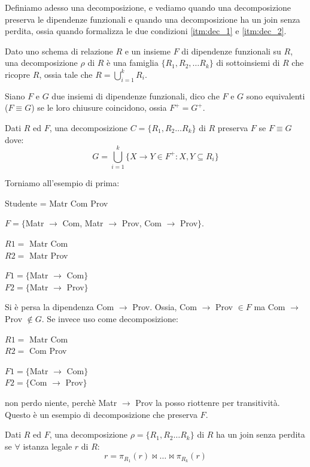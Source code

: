Definiamo adesso una decomposizione, e vediamo quando una decomposizione preserva le dipendenze funzionali e quando una decomposizione ha un join senza perdita, ossia quando formalizza le due condizioni \ref{itm:dec_1} e \ref{itm:dec_2}.

\begin{defn}
Dato uno schema di relazione $R$ e un insieme $F$ di dipendenze funzionali su $R$, una decomposizione $\rho$ di $R$ \`e una famiglia $\{R_1, R_2, \dots R_k\}$ di sottoinsiemi di $R$ che ricopre $R$, ossia tale che $R = \bigcup_{i = 1}^{k} R_i$.
\end{defn}

\begin{defn}
Siano $F$ e $G$ due insiemi di dipendenze funzionali, dico che $F$ e $G$ sono equivalenti ($F \equiv G$) se le loro chiusure coincidono, ossia $F^+ = G^+$.
\end{defn}

\begin{defn}
\label{definizione_insieme_G}
Dati $R$ ed $F$, una decomposizione $C = \{ R_1, R_2 \dots R_k\}$ di $R$ preserva $F$ se $F \equiv G$ dove:
\[
G = \bigcup_{i = 1}^{k} \{ X \to Y \in F^+ : X, Y \subseteq R_i \}
\]
\end{defn}

Torniamo all'esempio di prima:

Studente = Matr Com Prov

$F = \{$Matr $\to$ Com, Matr $\to$ Prov, Com $\to$ Prov$\}$.

$R1 =$ Matr Com \\
$R2 =$ Matr Prov

$F1 = \{$Matr $\to$ Com$\}$ \\
$F2 = \{$Matr $\to$ Prov$\}$

Si \`e persa la dipendenza Com $\to$ Prov. Ossia, Com $\to$ Prov $\in F$ ma Com $\to$ Prov $\notin G$. Se invece uso come decomposizione:

$R1 =$ Matr Com \\
$R2 =$ Com Prov

$F1 = \{$Matr $\to$ Com$\}$ \\
$F2 = \{$Com $\to$ Prov$\}$

non perdo niente, perch\`e Matr $\to$ Prov la posso riottenre per transitivit\`a. Questo \`e un esempio di decomposizione che preserva $F$.

\begin{defn}
Dati $R$ ed $F$, una decomposizione $\rho = \{ R_1, R_2 \dots R_k \}$ di $R$ ha un join senza perdita se $\forall $ istanza legale $r$ di $R$:
\[
r = \pi_{R_1}(r) \Join \dots \Join \pi_{R_k}(r)
\]
\end{defn}

